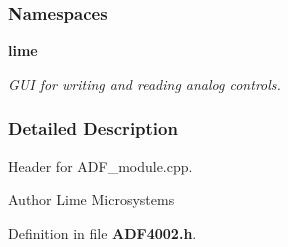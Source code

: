 \subsubsection*{Namespaces}
\begin{DoxyCompactItemize}
\item 
 {\bf lime}
\begin{DoxyCompactList}\small\item\em G\+UI for writing and reading analog controls. \end{DoxyCompactList}\end{DoxyCompactItemize}


\subsubsection{Detailed Description}
Header for A\+D\+F\+\_\+module.\+cpp. 

\begin{DoxyAuthor}{Author}
Lime Microsystems 
\end{DoxyAuthor}


Definition in file {\bf A\+D\+F4002.\+h}.

